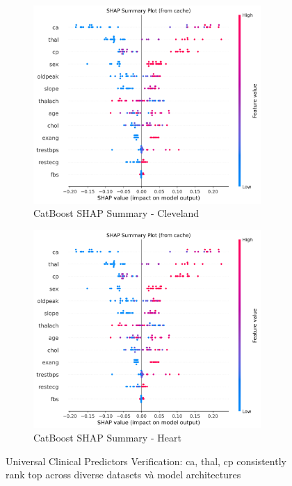 \begin{figure}[H]
\centering
\begin{subfigure}[b]{0.48\textwidth}
\centering
\includegraphics[width=0.95\textwidth]{Result/cleveland_dataset/Catboost/SHAP/Summary.png}
\caption{CatBoost SHAP Summary - Cleveland}
\label{fig:shap_summary_catboost_cleveland}
\end{subfigure}
\hfill
\begin{subfigure}[b]{0.48\textwidth}
\centering
\includegraphics[width=0.95\textwidth]{Result/heart_dataset/Catboost/SHAP/Summary.png}

\caption{CatBoost SHAP Summary - Heart}
\label{fig:shap_summary_catboost_heart}
\end{subfigure}
\caption{Universal Clinical Predictors Verification: ca, thal, cp consistently rank top across diverse datasets và model architectures}
\label{fig:universal_predictors_shap}
\end{figure}


